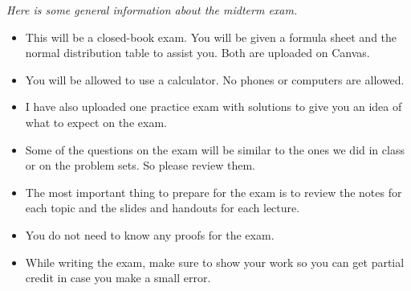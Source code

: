 \documentclass{./../../Latex/handout}
\begin{document}
\thispagestyle{plain}
\textit{Here is some general information about the midterm exam.}

\begin{itemize}
\item This will be a closed-book exam. You will be given a formula sheet and the normal distribution table to assist you. Both are uploaded on Canvas.
\item You will be allowed to use a calculator. No phones or computers are allowed. 
\item I have also uploaded one practice exam with solutions to give you an idea of what to expect on the exam. 
\item Some of the questions on the exam will be similar to the ones we did in class or on the problem sets. So please review them.
\item The most important thing to prepare for the exam is to review the notes for each topic and the slides and handouts for each lecture. 
\item You do not need to know any proofs for the exam.
\item While writing the exam, make sure to show your work so you can get partial credit in case you make a small error.  
\end{itemize}
\end{document}
